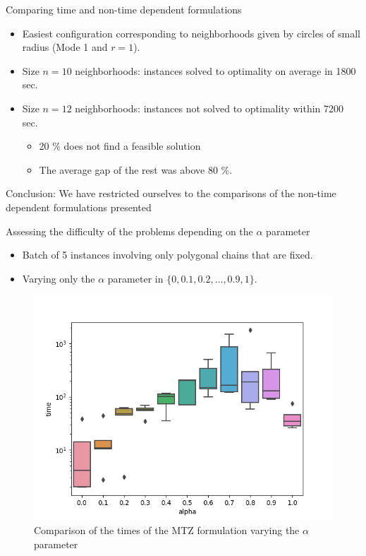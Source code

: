 \documentclass[slidestop,usepdftitle=false,10pt]{beamer}
\begin{document}
	\begin{frame}{Comparing time and non-time dependent formulations}
    \begin{itemize}
        \item Easiest configuration corresponding to neighborhoods given by circles of small radius (Mode 1 and $r=1$).
        \item Size $n= 10$ neighborhoods: instances solved to optimality on average in 1800 sec.
        \item Size $n= 12$ neighborhoods: instances not solved to optimality within 7200 sec. 
        \begin{itemize}
            \item 20 \% does not find a feasible solution
            \item The average gap of the rest was above 80 \%.
        \end{itemize}
    \end{itemize}
    
    \bigskip
    Conclusion: We have restricted ourselves to the comparisons of the non-time dependent formulations presented
	\end{frame}
	
	\begin{frame}{\large Assessing the difficulty of the problems depending on the $\alpha$ parameter}
	    \begin{itemize}
	        \item Batch of 5 instances involving only polygonal chains that are fixed.
	        \item Varying only the $\alpha$ parameter in $\{0, 0.1,0.2,\ldots,0.9,1\}$.
	    \end{itemize}

        \begin{figure}
         \centering
         \includegraphics[width=0.6\linewidth]{time_alpha.png}
         \caption{Comparison of the times of the MTZ formulation varying the $\alpha$ parameter}
         \label{fig:dibujo_alpha}
        \end{figure}

	\end{frame}
	
\end{document}
